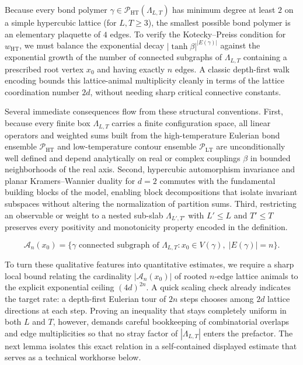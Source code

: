 \documentclass[11pt]{article}
\theoremstyle{definition}
\begin{document}
Because every bond polymer $\gamma \in \mathcal{P}_{\mathrm{HT}}(\Lambda_{L,T})$ has
minimum degree at least $2$ on a simple hypercubic lattice (for $L, T \ge 3$), the
smallest possible bond polymer is an elementary plaquette of $4$ edges. To verify
the Kotecky--Preiss condition for $w_{\mathrm{HT}}$, we must balance the exponential
decay $|\tanh \beta|^{|E(\gamma)|}$ against the exponential growth of the number of
connected subgraphs of $\Lambda_{L,T}$ containing a prescribed root vertex $x_0$ and
having exactly $n$ edges. A classic depth-first walk encoding bounds this
lattice-animal multiplicity cleanly in terms of the lattice coordination number
$2d$, without needing sharp critical connective constants.

Several immediate consequences flow from these structural conventions. First,
because every finite box $\Lambda_{L,T}$ carries a finite configuration space, all
linear operators and weighted sums built from the high-temperature Eulerian bond
ensemble $\mathcal{P}_{\mathrm{HT}}$ and low-temperature contour ensemble
$\mathcal{P}_{\mathrm{LT}}$ are unconditionally well defined and depend analytically
on real or complex couplings $\beta$ in bounded neighborhoods of the real axis.
Second, hypercubic automorphism invariance and planar Kramers--Wannier duality for
$d = 2$ commutes with the fundamental building blocks of the model, enabling block
decompositions that isolate invariant subspaces without altering the normalization
of partition sums. Third, restricting an observable or weight to a nested sub-slab
$\Lambda_{L',T'}$ with $L' \le L$ and $T' \le T$ preserves every positivity and
monotonicity property encoded in the definition.

\[
  \mathcal{A}_n(x_0) = \bigl\{\gamma \text{ connected subgraph of } \Lambda_{L,T} : x_0 \in V(\gamma),\; |E(\gamma)| = n\bigr\}.
\]

To turn these qualitative features into quantitative estimates, we require a sharp
local bound relating the cardinality $|\mathcal{A}_n(x_0)|$ of rooted $n$-edge
lattice animals to the explicit exponential ceiling $(4d)^{2n}$. A quick scaling
check already indicates the target rate: a depth-first Eulerian tour of $2n$ steps
chooses among $2d$ lattice directions at each step. Proving an inequality that stays
completely uniform in both $L$ and $T$, however, demands careful bookkeeping of
combinatorial overlaps and edge multiplicities so that no stray factor of
$|\Lambda_{L,T}|$ enters the prefactor. The next lemma isolates this exact relation
in a self-contained displayed estimate that serves as a technical workhorse below.
\end{document}
